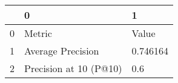 \begin{tabular}{lll}
\toprule
{} &                       0 &         1 \\
\midrule
0 &                  Metric &     Value \\
1 &       Average Precision &  0.746164 \\
2 &  Precision at 10 (P@10) &       0.6 \\
\bottomrule
\end{tabular}
